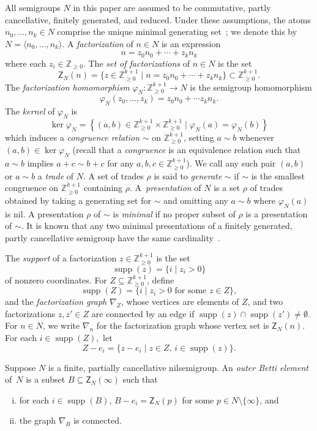\documentclass[10pt,a4paper]{amsart}
\newcommand\ZZ{\mathbb{Z}}
\newcommand\til{\mathord\sim}
\DeclareMathOperator\supp{supp}
\theoremstyle{definition}\newtheorem{defi}[thm]{Definition}
\begin{document}
All semigroups $N$ in this paper are assumed to be commutative, partly cancellative, finitely generated, and reduced.  Under these assumptions, the atoms $n_0, \ldots, n_k \in N$ comprise the unique minimal generating set~\cite{fingenmon}; we denote this by $N = \langle  n_0, \ldots, n_k \rangle$.  A \emph{factorization} of $n \in N$ is an expression
\[
n = z_0n_0 + \cdots + z_kn_k  
\]
where each $z_i \in \ZZ_{\geq 0}$. The \emph{set of factorizations} of $n \in N$ is the set
\[
\mathsf{Z}_N(n) = \{z \in \ZZ_{\geq 0}^{k+1} \mid n = z_0n_0 + \cdots + z_kn_k\} \subset \ZZ_{\geq 0}^{k+1}.
\]
The \emph{factorization homomorphism} $\varphi_N : \ZZ_{\geq 0}^{k+1} \to N$ is the semigroup homomorphism 
\[
\varphi_N(z_0,\ldots, z_k) = z_0n_0 + \cdots z_kn_k.
\]
The \emph{kernel} of $\varphi_N$ is 
\[
\ker \varphi_N = \left\{ (a,b) \in \ZZ_{\geq 0}^{k+1} \times \ZZ_{\geq 0}^{k+1} \mid \varphi_N(a) = \varphi_N(b) \right\}  
\]
which induces a \emph{congruence relation} $\til$ on $\ZZ_{\geq 0}^{k+1}$, setting $a \sim b$ whenever $(a,b) \in \ker \varphi_N$ (recall that a \emph{congruence} is an equivalence relation such that $a \sim b$ implies $a+c \sim b+c$ for any $a,b,c \in \ZZ_{\geq 0}^{k+1}$).  We call any such pair $(a,b)$ or $a \sim b$ a \emph{trade} of $N$.  
A set of trades $\rho$ is said to \emph{generate} $\til$ if $\til$ is the smallest congruence on $\ZZ_{\geq 0}^{k+1}$ containing $\rho$.  A~\emph{presentation} of $N$ is a set $\rho$ of trades obtained by taking a generating set for $\til$ and omitting any $a \sim b$ where $\varphi_N(a)$ is nil.  A presentation $\rho$ of $\til$ is \emph{minimal} if no proper subset of $\rho$ is a presentation of $\til$.  It is known that any two minimal presentations of a finitely generated, partly cancellative semigroup have the same cardinality~\cite{kunzfaces3,fingenmon}.  

The \emph{support} of a factorization $ z \in \ZZ_{\geq 0}^{k+1}$ is the set 
$$\supp(z) = \{i \mid z_i > 0\}$$
of nonzero coordinates.  For $Z \subseteq \ZZ_{\geq 0}^{k+1}$, define 
$$\supp(Z) = \{i \mid z_i > 0 \text{ for some } z \in Z\},$$
and the \emph{factorization graph} $\nabla_Z$, whose vertices are elements of $Z$, and two factorizations $z, z' \in Z$ are connected by an edge if $\supp(z) \cap \supp(z') \ne \emptyset$. For $n \in N$, we write $\nabla_n$ for the factorization graph whose vertex set is $\mathsf Z_N(n)$.  For each $i \in \supp(Z)$,~let
\[
Z - e_i = \{z-e_i \mid z \in Z, \, i \in \supp(z)\}.
\]

Suppose $N$ is a finite, partially cancellative nilsemigroup.  An \emph{outer Betti element} of~$N$ is a subset $B \subseteq \mathsf{Z}_N(\infty)$ such that
\begin{enumerate}[(i)]
\item for each $i \in \supp(B)$, $B - e_i = \mathsf{Z}_N(p)$ for some $p \in N \setminus \{\infty\}$, and
\item the graph $\nabla_B$ is connected.
\end{enumerate}
\end{document}
